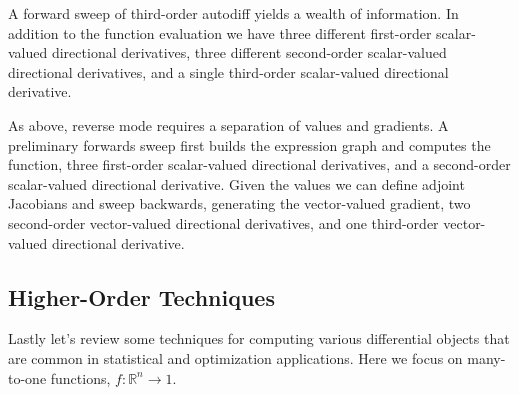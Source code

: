 \documentclass[11pt]{article}
\begin{document}
A forward sweep of third-order autodiff yields a wealth of information.  In addition
to the function evaluation we have three different first-order scalar-valued directional 
derivatives, three different second-order scalar-valued directional derivatives,
and a single third-order scalar-valued directional derivative.

As above, reverse mode requires a separation of values and gradients.  A
preliminary forwards sweep first builds the expression graph and computes the
function, three first-order scalar-valued directional derivatives, and a second-order
scalar-valued directional derivative.  Given the values we can define adjoint
Jacobians and sweep backwards, generating the vector-valued gradient,
two second-order vector-valued directional derivatives, and one third-order
vector-valued directional derivative.

\subsection*{Higher-Order Techniques}

Lastly let's review some techniques for computing various differential objects that
are common in statistical and optimization applications.  Here we focus on many-
to-one functions, $f : \mathbb{R}^{n} \rightarrow 1$.
\end{document}
